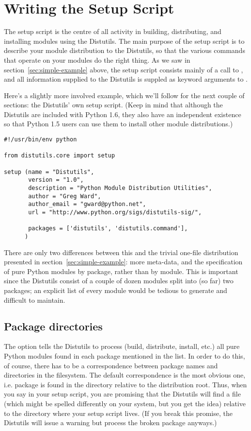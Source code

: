 \documentclass{howto}
\begin{document}
\section{Writing the Setup Script}
\label{sec:setup-script}

The setup script is the centre of all activity in building,
distributing, and installing modules using the Distutils.  The main
purpose of the setup script is to describe your module distribution to
the Distutils, so that the various commands that operate on your modules 
do the right thing.  As we saw in section~\ref{sec:simple-example}
above, the setup script consists mainly of a call to , and 
all information supplied to the Distutils is suppled as keyword
arguments to .

Here's a slightly more involved example, which we'll follow for the next
couple of sections: the Distutils' own setup script.  (Keep in mind that
although the Distutils are included with Python 1.6, they also have an
independent existence so that Python 1.5 users can use them to install
other module distributions.)

\begin{verbatim}
#!/usr/bin/env python

from distutils.core import setup

setup (name = "Distutils",
       version = "1.0",
       description = "Python Module Distribution Utilities",
       author = "Greg Ward",
       author_email = "gward@python.net",
       url = "http://www.python.org/sigs/distutils-sig/",

       packages = ['distutils', 'distutils.command'],
      )
\end{verbatim}
There are only two differences between this and the trivial one-file
distribution presented in section~\ref{sec:simple-example}: more
meta-data, and the specification of pure Python modules by package,
rather than by module.  This is important since the Distutils consist of
a couple of dozen modules split into (so far) two packages; an explicit
list of every module would be tedious to generate and difficult to
maintain.


\subsection{Package directories}
\label{sec:package-dirs}

The  option tells the Distutils to process (build,
distribute, install, etc.) all pure Python modules found in each package
mentioned in the  list.  In order to do this, of
course, there has to be a correspondence between package names and
directories in the filesystem.  The default correspondence is the most
obvious one, i.e. package  is found in the directory
 relative to the distribution root.  Thus, when you say
 in your setup script, you are promising that
the Distutils will find a file  (which might
be spelled differently on your system, but you get the idea) relative to
the directory where your setup script lives.  (If you break this
promise, the Distutils will issue a warning but process the broken
package anyways.)
\end{document}
